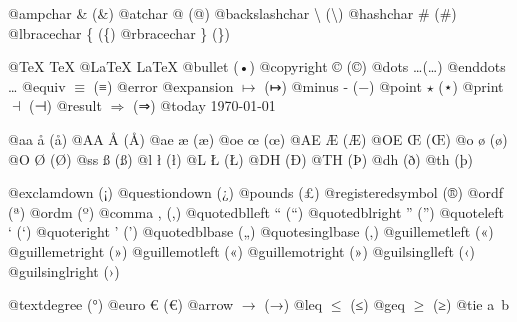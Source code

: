 \documentclass{book}
\renewcommand{\_}{\Texinfounderscore\discretionary{}{}{}}
\begin{document}
\begin{titlepage}
@ampchar \& (\&)
@atchar @ (@)
@backslashchar \textbackslash{} (\textbackslash{})
@hashchar \# (\#)
@lbracechar \{ (\{)
@rbracechar \} (\})

@TeX \TeX{}
@LaTeX \LaTeX{}
@bullet \textbullet{} (•)
@copyright \copyright{} (©)
@dots \dots{}\@ (…)
@enddots \dots{}
@equiv $\equiv{}$ (≡)
@error 
@expansion $\mapsto{}$ (↦)
@minus - (−)
@point $\star{}$ (⋆)
@print $\dashv{}$ (⊣)
@result $\Rightarrow{}$ (⇒)
@today \today{}

@aa \aa{} (å)
@AA \AA{} (Å)
@ae \ae{} (æ)
@oe \oe{} (œ)
@AE \AE{} (Æ)
@OE \OE{} (Œ)
@o \o{} (ø)
@O \O{} (Ø)
@ss \ss{} (ß)
@l \l{} (ł)
@L \L{} (Ł)
@DH \DH{} (Ð)
@TH \TH{} (Þ)
@dh \dh{} (ð)
@th \th{} (þ)

@exclamdown \textexclamdown{} (¡)
@questiondown \textquestiondown{} (¿)
@pounds \textsterling{} (£)
@registeredsymbol \circledR{} (®)
@ordf \textordfeminine{} (ª)
@ordm \textordmasculine{} (º)
@comma , (,)
@quotedblleft \textquotedblleft{} (“)
@quotedblright \textquotedblright{} (”)
@quoteleft \textquoteleft{} (‘)
@quoteright \textquoteright{} (’)
@quotedblbase \quotedblbase{} („)
@quotesinglbase \quotesinglbase{} (‚)
@guillemetleft \guillemotleft{} («)
@guillemetright \guillemotright{} (»)
@guillemotleft \guillemotleft{} («)
@guillemotright \guillemotright{} (»)
@guilsinglleft \guilsinglleft{} (‹)
@guilsinglright \guilsinglright{} (›)

@textdegree \textdegree{} (°)
@euro \euro{} (€)
@arrow $\rightarrow{}$ (→)
@leq $\leq{}$ (≤)
@geq $\geq{}$ (≥)
@tie a~b


\end{titlepage}
\end{document}
